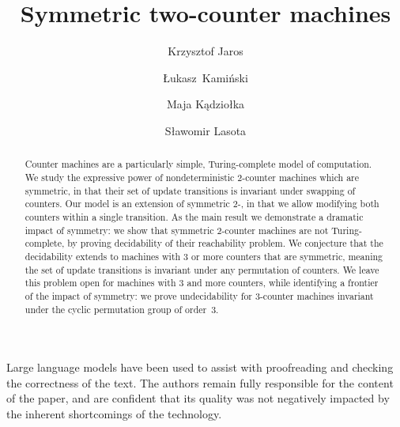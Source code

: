\documentclass[a4paper,UKenglish,cleveref, autoref, thm-restate,dvipsnames]{lipics-v2021}
\title{Symmetric two-counter machines%
}
\author{Krzysztof Jaros}{University of Warsaw}{}
{}
{
Supported by the NCN grant 2024/55/B/ST6/01674.
}
\author{{\L}ukasz~Kami{\'n}ski}{University of Warsaw}{}
{https://orcid.org/0009-0004-1641-9049}
{Supported by the NCN grant 2024/55/B/ST6/01674.}
\author{Maja K\k{a}dzio{\l}ka}{University of Warsaw}{}
{https://orcid.org/0009-0001-1308-9492}
{Supported by the NCN grant 2024/55/B/ST6/01674.}
\author{S{\l}awomir Lasota}{University of Warsaw}{}
{https://orcid.org/0000-0001-8674-4470}
{Partially supported by ERC grant INFSYS, agreement no. 950398, and 
 by the NCN grant 2024/55/B/ST6/01674.}
\begin{document}
\maketitle

\begin{abstract}
Counter machines are a particularly simple, Turing-complete
model of computation.
We study the expressive power of nondeterministic
2-counter machines which are symmetric, in that their set of
update transitions is invariant under swapping of counters.
Our model is an extension of symmetric 2-\vass, in that
we allow modifying both counters within a single transition.
As the main result we demonstrate a dramatic impact of symmetry:
we show that symmetric 2-counter machines
are not Turing-complete, by proving decidability of their 
reachability problem.
We conjecture that the decidability extends to 
machines with 3 or more counters that are symmetric, 
meaning the set of update transitions is
invariant under any permutation of counters. 
We leave this problem open for machines with 3 and more counters,
while identifying a frontier of the impact of symmetry: we prove
undecidability for 3-counter machines invariant under the
cyclic permutation group of order~3.
\end{abstract}

{
\small
{}
Large language models have been used to assist with proofreading and checking the correctness of the text.
The authors remain fully responsible for the content of the paper, and are confident that its quality
was not negatively impacted by the inherent shortcomings of the technology.
}

\newpage

    

    
    
    

    




\end{document}
